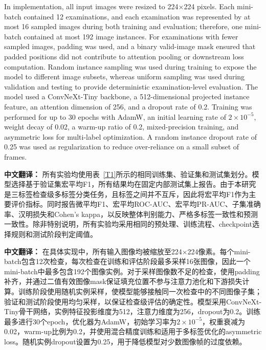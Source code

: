 \documentclass[Afour,sagev,times]{sagej}
\begin{document}
In implementation, all input images were resized to 224$\times$224 pixels. Each mini-batch contained 12 examinations, and each examination was represented by at most 16 sampled images during both training and evaluation; therefore, one mini-batch contained at most 192 image instances. For examinations with fewer sampled images, padding was used, and a binary valid-image mask ensured that padded positions did not contribute to attention pooling or downstream loss computation. Random instance sampling was used during training to expose the model to different image subsets, whereas uniform sampling was used during validation and testing to provide deterministic examination-level evaluation. The model used a ConvNeXt-Tiny backbone, a 512-dimensional projected instance feature, an attention dimension of 256, and a dropout rate of 0.2. Training was performed for up to 30 epochs with AdamW,\cite{R19} an initial learning rate of $2\times10^{-5}$, weight decay of 0.02, a warm-up ratio of 0.2, mixed-precision training, and asymmetric loss for multi-label optimization.\cite{R20} A random instance dropout rate of 0.25 was used as regularization to reduce over-reliance on a small subset of frames.

\textbf{中文翻译：} 所有实验均使用表~\ref{T1}所示的相同训练集、验证集和测试集划分。模型选择基于验证集宏平均F1，所有结果均在固定内部测试集上报告。由于本研究是三标签检查级多标签分类任务，且标签之间并不互斥，因此将宏平均F1作为主要评价指标。同时报告微平均F1、宏平均ROC-AUC、宏平均PR-AUC、子集准确率、汉明损失和Cohen's kappa，以反映整体判别能力、严格多标签一致性和预测一致性。除非特别说明，所有实验均采用相同的预处理、训练流程、checkpoint选择规则和测试阶段判定阈值。

\textbf{中文翻译：} 在具体实现中，所有输入图像均被缩放至224$\times$224像素。每个mini-batch包含12次检查，每次检查在训练和评估阶段最多采样16张图像，因此一个mini-batch中最多包含192个图像实例。对于采样图像数不足的检查，使用padding补齐，并通过二值有效图像mask保证填充位置不参与注意力池化和下游损失计算。训练阶段使用随机实例采样，使模型能够接触同一次检查中的不同图像子集；验证和测试阶段使用均匀采样，以保证检查级评估的确定性。模型采用ConvNeXt-Tiny骨干网络，实例特征投影维度为512，注意力维度为256，dropout为0.2。训练最多进行30个epoch，优化器为AdamW，初始学习率为$2\times10^{-5}$，权重衰减为0.02，warm-up比例为0.2，并使用混合精度训练和适用于多标签优化的asymmetric loss。随机实例dropout设置为0.25，用于降低模型对少数图像帧的过度依赖。
\end{document}
